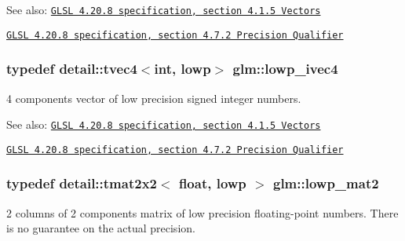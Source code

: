 \begin{Desc}
\item[See also:]\href{http://www.opengl.org/registry/doc/GLSLangSpec.4.20.8.pdf}{\tt GLSL 4.20.8 specification, section 4.1.5 Vectors} 

\href{http://www.opengl.org/registry/doc/GLSLangSpec.4.20.8.pdf}{\tt GLSL 4.20.8 specification, section 4.7.2 Precision Qualifier} \end{Desc}
\hypertarget{group__core__precision_gb9b404ae623385d5094499d2d4e4616d}{
\subsubsection[lowp\_\-ivec4]{\setlength{\rightskip}{0pt plus 5cm}typedef detail::tvec4$<$int, lowp$>$ {\bf glm::lowp\_\-ivec4}}}
\label{group__core__precision_gb9b404ae623385d5094499d2d4e4616d}


4 components vector of low precision signed integer numbers.

\begin{Desc}
\item[See also:]\href{http://www.opengl.org/registry/doc/GLSLangSpec.4.20.8.pdf}{\tt GLSL 4.20.8 specification, section 4.1.5 Vectors} 

\href{http://www.opengl.org/registry/doc/GLSLangSpec.4.20.8.pdf}{\tt GLSL 4.20.8 specification, section 4.7.2 Precision Qualifier} \end{Desc}
\hypertarget{group__core__precision_gc0acc3ccf8da050af3393ea639f698d6}{
\subsubsection[lowp\_\-mat2]{\setlength{\rightskip}{0pt plus 5cm}typedef detail::tmat2x2$<$ float, lowp $>$ {\bf glm::lowp\_\-mat2}}}
\label{group__core__precision_gc0acc3ccf8da050af3393ea639f698d6}


2 columns of 2 components matrix of low precision floating-point numbers. There is no guarantee on the actual precision.

